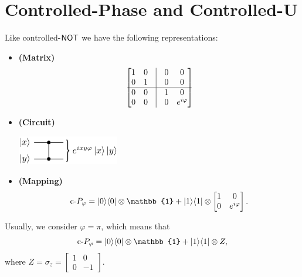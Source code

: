 \documentclass[12pt]{article}
\begin{document}
\section{Controlled-Phase and Controlled-U}
\begin{definition}
Like controlled-${\textsf{NOT}}$ we have the following representations:
\begin{itemize}
    \item \textbf{(Matrix)} $$
    \begin{bmatrix}
        1 & 0 & \vline & 0 & 0 \\
        0 & 1 & \vline & 0 & 0 \\
        \hline
        0 & 0 & \vline & 1 & 0 \\
        0 & 0 & \vline & 0 & e^{i\varphi} \\
    \end{bmatrix}
    $$
    \item \textbf{(Circuit)}
    \begin{center}
        \includegraphics[width = 12em]{images/7.jpg}
    \end{center}
    \item \textbf{(Mapping)} $$
    \text{c-}P_{\varphi} = \kb{0}{0}\otimes \mathbb{1} + \kb{1}{1}\otimes \begin{bmatrix}
        1 & 0 \\
        0 & e^{i\varphi}
    \end{bmatrix}.
    $$
\end{itemize}
\end{definition}

\begin{remark}\label{rmk:varphi-convention}
Usually, we consider $\varphi = \pi$, which means that $$
    \text{c-}P_{\varphi} = \kb{0}{0}\otimes \mathbb{1} + \kb{1}{1}\otimes Z,
    $$ where $Z = \sigma_z = \begin{bmatrix}
        1 & 0\\
        0 & -1
    \end{bmatrix}$.
\end{remark}
\end{document}
